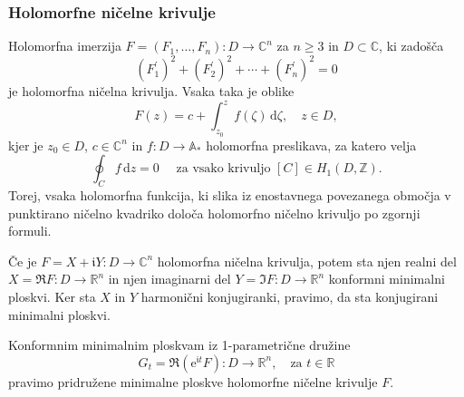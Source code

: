 \documentclass[8pt]{beamer}
\theoremstyle{definition}
\theoremstyle{remark}
\theoremstyle{plain}
\numberwithin{equation}{section}  %
\begin{document}
\begin{frame}
    \frametitle{Holomorfne ničelne krivulje}

    Holomorfna imerzija $F=\left(F_1, \ldots, F_n\right): D \rightarrow \mathbb{C}^n$ za $n\geq 3$ in $D\subset \mathbb{C}$, ki zadošča  
    \begin{equation*}
        \left(F_1^{\prime}\right)^2+\left(F_2^{\prime}\right)^2+\cdots+\left(F_n^{\prime}\right)^2=0      
    \end{equation*}
    je \textcolor{red1}{holomorfna ničelna krivulja}. Vsaka taka je oblike 
    \begin{equation*}
        F(z)=c+\int_{z_0}^z f(\zeta) \, \mathrm{d} \zeta, \quad z \in D,
    \end{equation*}
    kjer je $z_0\in D$, $c \in \mathbb{C}^n$ in $f:D \rightarrow \mathbb{A}_*$ holomorfna preslikava, za katero velja
    \begin{equation*}
        \oint_C f \, \mathrm{d} z=0 \quad \text { za vsako krivuljo } [C] \in H_1(D, \mathbb{Z}). 
    \end{equation*}
    Torej, vsaka holomorfna funkcija, ki slika iz enostavnega povezanega območja v punktirano ničelno kvadriko določa holomorfno ničelno krivuljo po zgornji formuli. 

    \vspace{0.8em}
    
    Če je $F=X+\mathfrak{i} Y: D \rightarrow \mathbb{C}^n$ holomorfna ničelna krivulja, potem sta njen realni del $X=\Re F: D \rightarrow \mathbb{R}^n$ in njen imaginarni del $Y=\Im F: D \rightarrow \mathbb{R}^n$ konformni minimalni ploskvi. 
    Ker sta $X$ in $Y$ harmonični konjugiranki, pravimo, da sta \textcolor{red1}{konjugirani minimalni ploskvi}. 
    
    \vspace{0.8em}

    Konformnim minimalnim ploskvam iz 1-parametrične družine 
    \begin{equation*}
        G_t=\Re\left(\mathrm{e}^{\mathfrak{i} t} F\right): D \longrightarrow \mathbb{R}^n, \quad \text{za }t \in \mathbb{R}
    \end{equation*}
    pravimo \textcolor{red1}{pridružene minimalne ploskve} holomorfne ničelne krivulje $F$.
\end{frame}
\end{document}
